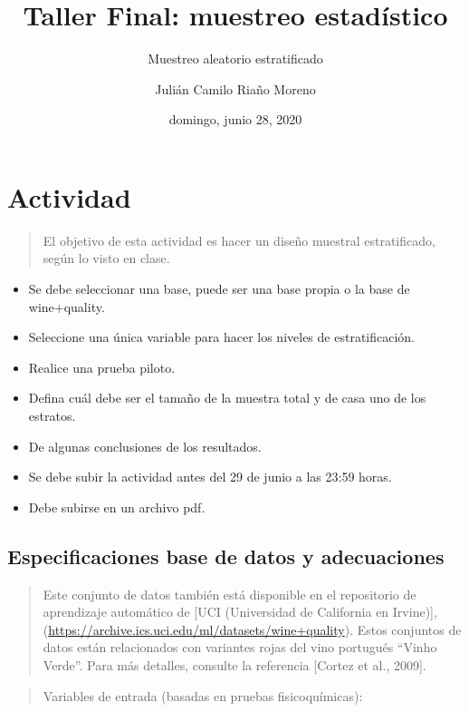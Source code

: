 \documentclass[
]{article}
\title{Taller Final: muestreo estadístico}
\subtitle{Muestreo aleatorio estratificado}
\author{Julián Camilo Riaño Moreno}
\date{domingo, junio 28, 2020}
\providecommand{\tightlist}{%
  \setlength{\itemsep}{0pt}\setlength{\parskip}{0pt}}
\begin{document}
\maketitle

{
\setcounter{tocdepth}{2}
\tableofcontents
}
\hypertarget{actividad}{%
\section{Actividad}\label{actividad}}

\begin{quote}
El objetivo de esta actividad es hacer un diseño muestral estratificado,
según lo visto en clase.
\end{quote}

\begin{itemize}
\tightlist
\item
  Se debe seleccionar una base, puede ser una base propia o la base de
  wine+quality.
\item
  Seleccione una única variable para hacer los niveles de
  estratificación.
\item
  Realice una prueba piloto.
\item
  Defina cuál debe ser el tamaño de la muestra total y de casa uno de
  los estratos.
\item
  De algunas conclusiones de los resultados.
\item
  Se debe subir la actividad antes del 29 de junio a las 23:59 horas.
\item
  Debe subirse en un archivo pdf.
\end{itemize}

\hypertarget{especificaciones-base-de-datos-y-adecuaciones}{%
\subsection{Especificaciones base de datos y
adecuaciones}\label{especificaciones-base-de-datos-y-adecuaciones}}

\begin{quote}
Este conjunto de datos también está disponible en el repositorio de
aprendizaje automático de {[}UCI (Universidad de California en
Irvine){]},
(\url{https://archive.ics.uci.edu/ml/datasets/wine+quality}). Estos
conjuntos de datos están relacionados con variantes rojas del vino
portugués ``Vinho Verde''. Para más detalles, consulte la referencia
{[}Cortez et al., 2009{]}.
\end{quote}

\begin{quote}
Variables de entrada (basadas en pruebas fisicoquímicas):
\end{quote}
\end{document}
